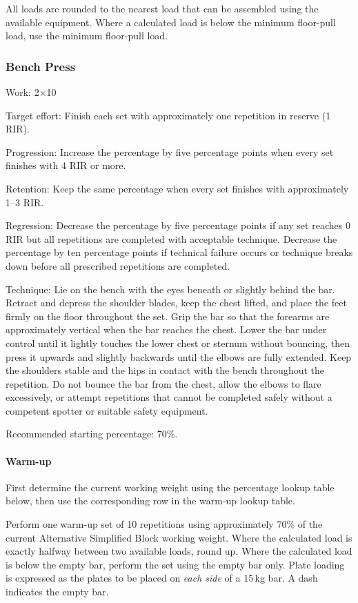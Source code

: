 \documentclass[11pt,a4paper]{article}
\begin{document}
All loads are rounded to the nearest load that can be assembled using the available equipment. Where a calculated load is below the minimum floor-pull load, use the minimum floor-pull load.

\newpage
\subsubsection{Bench Press}

Work: 2$\times$10

Target effort: Finish each set with approximately one repetition in reserve (1 RIR).

Progression: Increase the percentage by five percentage points when every set finishes with 4 RIR or more.

Retention: Keep the same percentage when every set finishes with approximately 1--3 RIR.

Regression: Decrease the percentage by five percentage points if any set reaches 0 RIR but all repetitions are completed with acceptable technique. Decrease the percentage by ten percentage points if technical failure occurs or technique breaks down before all prescribed repetitions are completed.

Technique: Lie on the bench with the eyes beneath or slightly behind the bar. Retract and depress the shoulder blades, keep the chest lifted, and place the feet firmly on the floor throughout the set. Grip the bar so that the forearms are approximately vertical when the bar reaches the chest. Lower the bar under control until it lightly touches the lower chest or sternum without bouncing, then press it upwards and slightly backwards until the elbows are fully extended. Keep the shoulders stable and the hips in contact with the bench throughout the repetition. Do not bounce the bar from the chest, allow the elbows to flare excessively, or attempt repetitions that cannot be completed safely without a competent spotter or suitable safety equipment.

Recommended starting percentage: 70\%.

\paragraph{Warm-up}

First determine the current working weight using the percentage lookup table below, then use the corresponding row in the warm-up lookup table.

Perform one warm-up set of 10 repetitions using approximately 70\% of the current Alternative Simplified Block working weight. Where the calculated load is exactly halfway between two available loads, round up. Where the calculated load is below the empty bar, perform the set using the empty bar only. Plate loading is expressed as the plates to be placed on \emph{each side} of a 15\,kg bar. A dash indicates the empty bar.
\end{document}
